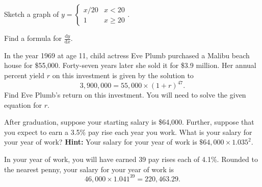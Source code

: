 \documentclass[12pt, fleqn]{exam}
\begin{document}
\begin{questions}

\question Sketch a graph of $y = \begin{cases} x/20  & x < 20 \\
                                            1 & x \geq 20 \end{cases}.$

Find a formula for $\displaystyle \frac{\mathrm{d} y}{\mathrm{d}x} $. 


\question  In the year 1969 at age 11, child actress Eve Plumb purchased a Malibu beach house for \$55,000. Forty-seven years
later she sold it for \$3.9 million. Her annual percent yield $r$ on this investment is given by the solution to
\[
       3, 900,000 = 55,000 \times (1 + r)^{47}.
\]
Find Eve Plumb's return on this investment. You will need to solve the given equation for $r$.
    \begin{solution}%
    \end{solution}
    \question   After graduation, suppose your starting salary is \$64,000. Further, suppose
that you expect to earn a 3.5\% pay rise each year you work. What is your salary for 
your  year of work?  \textbf{Hint:} Your salary for your  year of work
is $\$64,000 \times 1.035^2$.
\begin{solution}%
In your  year of work, you will have earned 39 pay rises each of 4.1\%. Rounded to 
the nearest penny, your salary for your  year of work is
\begin{equation*}
   46,000 \times 1.041^{39} = 220,463.29.
 \end{equation*}   
\end{solution}


\end{questions}
\end{document}
